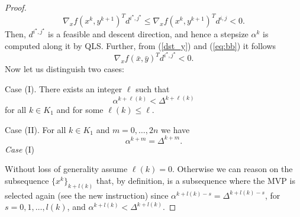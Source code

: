 \begin{proof}
\begin{equation}
 \nabla_xf(x^k,y^{k+1})^Td^{i^\star,j^\star}\le \nabla_xf(x^k,y^{k+1})^Td^{i,j}<0.
\end{equation}
Then, $d^{i^\star,j^\star}$ is a feasible and descent direction, and hence a stepsize $\alpha^k$ is computed along it by QLS.
Further, from (\ref{dst_y}) and (\ref{eq:bb}) it follows
\begin{equation}\label{desc_mvp}
 \nabla_xf(\bar x,\bar y)^Td^{i^\star,j^\star}<0.
\end{equation}
Now let us distinguish two cases:
\par\medskip\noindent
Case (I). There exists an integer $\ell$  such that
\begin{equation}\label{caseI}
 \alpha^{k+\ell(k)}<\Delta^{k+\ell(k)}
\end{equation}
for all $k\in K_1$ and for some $\ell(k)\le \ell$.
\par\medskip\noindent 
Case (II). For all $k\in K_1$ and $m=0,\ldots ,2n$ we have
\begin{equation}\label{caseII}
 \alpha^{k+m}=\Delta^{k+m}.
\end{equation}
{\it Case} (I)
\par\medskip\noindent
Without loss of generality assume $\ell (k)=0$.
Otherwise we can reason on the subsequence $\{x^k\}_{k+l(k)}$ that, by definition, is a subsequence where the  MVP is selected again (see the new instruction) since $\alpha^{k+l(k)-s}=\Delta^{k+l(k)-s}$,
for $s=0,1,\ldots ,l(k)$,
and $\alpha^{k+l(k)}<\Delta^{k+l(k)}$.


\end{proof}
